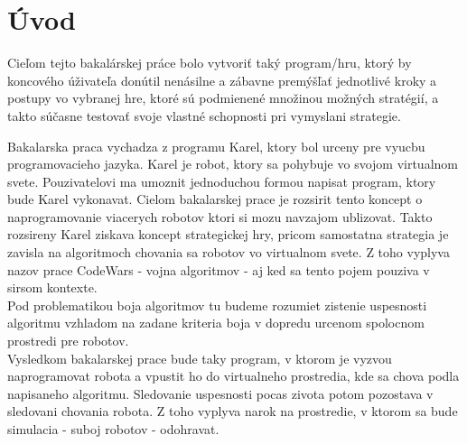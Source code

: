 \documentclass[a4paper,11pt,final]{report}
\begin{document}
\chapter{Úvod}
                                   
Cieľom tejto bakalárskej práce bolo vytvoriť taký program/hru, ktorý by koncového úživateľa donútil nenásilne a zábavne premýšľať jednotlivé kroky a postupy vo vybranej hre, ktoré sú podmienené množinou možných stratégií, a takto súčasne testovať svoje vlastné schopnosti pri vymyslani strategie.

Bakalarska praca vychadza z programu Karel, ktory bol urceny pre vyucbu programovacieho jazyka. Karel je robot, ktory sa pohybuje vo svojom virtualnom svete. Pouzivatelovi ma umoznit jednoduchou formou napisat program, ktory bude Karel vykonavat. Cielom bakalarskej prace je rozsirit tento koncept o naprogramovanie viacerych robotov ktori si mozu navzajom ublizovat. Takto rozsireny Karel ziskava koncept strategickej hry, pricom samostatna strategia je zavisla na algoritmoch chovania sa robotov vo virtualnom svete. Z toho vyplyva nazov prace CodeWars - vojna algoritmov - aj ked sa tento pojem pouziva v sirsom kontexte.\\
Pod problematikou boja algoritmov tu budeme rozumiet zistenie uspesnosti algoritmu vzhladom na zadane kriteria boja v dopredu urcenom spolocnom prostredi pre robotov. \\
Vysledkom bakalarskej prace bude taky program, v ktorom je vyzvou naprogramovat robota a vpustit ho do virtualneho prostredia, kde sa chova podla napisaneho algoritmu. Sledovanie uspesnosti pocas zivota potom pozostava v sledovani chovania robota. Z toho vyplyva narok na prostredie, v ktorom sa bude simulacia - suboj robotov - odohravat. \\
\end{document}
